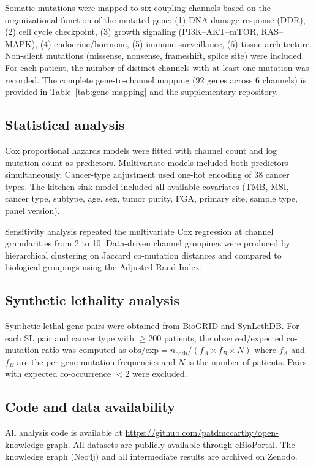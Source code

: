 \documentclass[11pt]{article}
\begin{document}
Somatic mutations were mapped to six coupling channels based on the
organizational function of the mutated gene: (1) DNA damage response
(DDR), (2) cell cycle checkpoint, (3) growth signaling (PI3K--AKT--mTOR,
RAS--MAPK), (4) endocrine/hormone, (5) immune surveillance,
(6) tissue architecture. Non-silent mutations (missense, nonsense,
frameshift, splice site) were included. For each patient, the number
of distinct channels with at least one mutation was recorded. The
complete gene-to-channel mapping (92 genes across 6 channels) is
provided in Table~\ref{tab:gene-mapping} and the supplementary
repository.

\subsection*{Statistical analysis}

Cox proportional hazards models were fitted with channel count and
log mutation count as predictors. Multivariate models included both
predictors simultaneously. Cancer-type adjustment used one-hot
encoding of 38 cancer types. The kitchen-sink model included all
available covariates (TMB, MSI, cancer type, subtype, age, sex,
tumor purity, FGA, primary site, sample type, panel version).

Sensitivity analysis repeated the multivariate Cox regression at
channel granularities from 2 to 10. Data-driven channel groupings
were produced by hierarchical clustering on Jaccard co-mutation
distances and compared to biological groupings using the Adjusted
Rand Index.

\subsection*{Synthetic lethality analysis}

Synthetic lethal gene pairs were obtained from BioGRID and
SynLethDB. For each SL pair and cancer type with $\geq 200$
patients, the observed/expected co-mutation ratio was computed as
$\text{obs/exp} = n_{\text{both}} / (f_A \times f_B \times N)$
where $f_A$ and $f_B$ are the per-gene mutation frequencies and $N$
is the number of patients. Pairs with expected co-occurrence $< 2$
were excluded.

\subsection*{Code and data availability}

All analysis code is available at
\url{https://github.com/patdmccarthy/open-knowledge-graph}.
All datasets are publicly available through cBioPortal.
The knowledge graph (Neo4j) and all intermediate results are
archived on Zenodo.
\end{document}
